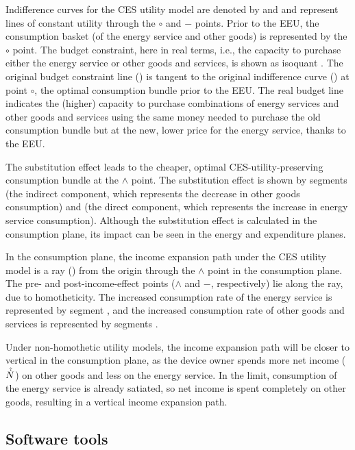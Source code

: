 \documentclass[12pt]{article}\usepackage[]{graphicx}\usepackage[]{xcolor}
\begin{document}
Indifference curves for the CES utility model
are denoted by \iicirc{} and \iibar{}
and represent lines of constant utility through the $\circ$ and $-$ points.
Prior to the EEU, the consumption basket (of the energy service and other goods)
is represented by the $\circ$ point.
The budget constraint,
here in real terms, i.e.,
the capacity to purchase either the energy service or other goods and services,
is shown as isoquant \circcirc{}.
The original budget constraint line (\circcirc{})
is tangent to the original indifference curve
(\iicirc{}) at point $\circ$, the optimal consumption
bundle prior to the EEU.
The real budget line \starstar{}
indicates the (higher) capacity to purchase
combinations of energy services and other goods and services
using the same money needed to purchase
the old consumption bundle but at the new, lower price
for the energy service,
thanks to the EEU.

The substitution effect leads to the cheaper, optimal
CES-utility-preserving
consumption bundle at the $\wedge$ point.
The substitution effect is shown by segments
\starc{} (the indirect component, which represents the decrease in other goods consumption) and
\chat{} (the direct component, which represents the increase in energy service consumption).
Although the substitution effect is calculated
in the consumption plane,
its impact
can be seen in
the energy and expenditure planes.

In the consumption plane,
the income expansion path under the CES utility model
is a ray (\rr{}) from the origin through the $\wedge$ point
in the consumption plane.
The pre- and post-income-effect
points ($\wedge$ and $-$, respectively)
lie along the \rr{} ray, due to homotheticity.
The increased consumption rate of the energy service is
represented by segment \hatd{}, and
the increased consumption rate of other goods and services is
represented by segments \dbar{}.

Under non-homothetic utility models,
the income expansion path will be closer to vertical
in the consumption plane,
as the device owner spends more net income ($\hat{\dot{N}}$)
on other goods and less on the energy service.
In the limit, consumption of the energy service
is already satiated, so
net income is spent completely on other goods,
resulting in a vertical income expansion path.


\subsection{Software tools}
\label{sec:software_tools}
\end{document}

